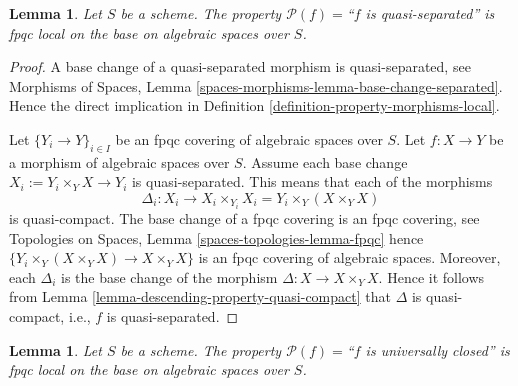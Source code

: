 \documentclass{stacks-project}
\theoremstyle{plain}
\newtheorem{lemma}[subsection]{Lemma}
\theoremstyle{definition}
\theoremstyle{remark}
\numberwithin{equation}{subsection}
\begin{document}
\begin{lemma}
\label{lemma-descending-property-quasi-separated}
Let $S$ be a scheme.
The property $\mathcal{P}(f) =$``$f$ is quasi-separated''
is fpqc local on the base on algebraic spaces over $S$.
\end{lemma}

\begin{proof}
A base change of a quasi-separated morphism is quasi-separated, see
Morphisms of Spaces,
Lemma \ref{spaces-morphisms-lemma-base-change-separated}.
Hence the direct implication in
Definition \ref{definition-property-morphisms-local}.

\medskip\noindent
Let $\{Y_i \to Y\}_{i \in I}$ be an fpqc covering of algebraic spaces over $S$.
Let $f : X \to Y$ be a morphism of algebraic spaces over $S$.
Assume each base change $X_i := Y_i \times_Y X \to Y_i$ is quasi-separated.
This means that each of the morphisms
$$
\Delta_i :
X_i
\longrightarrow
X_i \times_{Y_i} X_i = Y_i \times_Y (X \times_Y X)
$$
is quasi-compact. The base change of a fpqc covering is an fpqc covering, see
Topologies on Spaces, Lemma \ref{spaces-topologies-lemma-fpqc}
hence $\{Y_i \times_Y (X \times_Y X) \to X \times_Y X\}$
is an fpqc covering of algebraic spaces. Moreover, each
$\Delta_i$ is the base change of the morphism
$\Delta : X \to X \times_Y X$. Hence it follows from
Lemma \ref{lemma-descending-property-quasi-compact}
that $\Delta$ is quasi-compact, i.e., $f$ is quasi-separated.
\end{proof}

\begin{lemma}
\label{lemma-descending-property-universally-closed}
Let $S$ be a scheme.
The property $\mathcal{P}(f) =$``$f$ is universally closed''
is fpqc local on the base on algebraic spaces over $S$.
\end{lemma}
\end{document}
